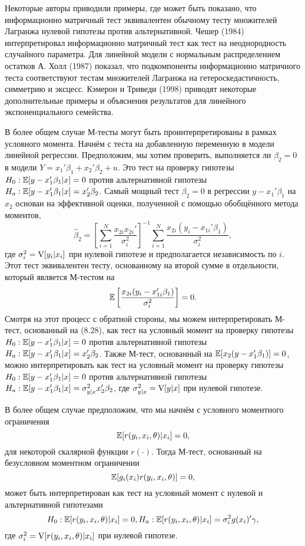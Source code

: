 Некоторые авторы приводили примеры, где может быть показано, что информационно матричный тест эквивалентен обычному тесту множителей Лагранжа нулевой гипотезы против альтернативной. Чешер (1984) интерпретировал информационно матричный тест как тест на неоднородность случайного параметра. Для линейной модели с нормальным распределением остатков А. Холл (1987) показал, что подкомпоненты информационно матричного теста соответствуют тестам множителей Лагранжа на гетероскедастичность, симметрию и эксцесс. Кэмерон и Триведи (1998) приводят некоторые дополнительные примеры и объяснения результатов для линейного экспоненциального семейства.

В более общем случае М-тесты могут быть проинтерпретированы в рамках условного момента. Начнём с теста на добавленную переменную в модели линейной регрессии. Предположим, мы хотим проверить, выполняется ли $\beta_2 = 0$ в модели $Y = x_1'\beta_1 + x_2'\beta_2 + u$. Это тест на проверку гипотезы $H_0: \mathbb{E}[y - x_1'\beta_1|x] = 0$ против альтернативной гипотезы $H_a: \mathbb{E}[y - x_1'\beta_1|x] = x_2'\beta_2$. Самый мощный тест $\beta_2 = 0$ в регрессии $y - x_1'\beta_1$ на $x_2$ основан на эффективной оценки, полученной с помощью обобщённого метода моментов,
\[
\hat{\beta}_2 = \left[ \sum_{i=1}^N \frac{x_{2i}x_{2i}'}{\sigma_i^2}\right]^{-1} \sum_{i=1}^N \frac{x_{2i}(y_i - x_{1i}'\beta_1)}{\sigma_i^2},
\]
где $\sigma_i^2 = \mathrm{V}[y_i|x_i]$ при нулевой гипотезе и предполагается независимость по $i$. Этот тест эквивалентен тесту, основанному на второй сумме в отдельности, который является М-тестом на
\begin{equation}
\mathbb{E}\left[ \frac{x_{2i}(y_i - x_{1i}'\beta_1)}{\sigma_i^2} \right] = 0.
\end{equation}
Смотря на этот процесс с обратной стороны, мы можем интерпретировать М-тест, основанный на (8.28), как тест на условный момент на проверку гипотезы $H_0: \mathbb{E}[y - x_1'\beta_1|x] = 0$ против альтернативной гипотезы $H_a: \mathbb{E}[y - x_1'\beta_1|x] = x_2'\beta_2$. Также М-тест, основанный на $\mathbb{E}[x_2(y - x_1'\beta_1)] = 0$, можно интерпретировать как тест на условный момент на проверку гипотезы $H_0: \mathbb{E}[y - x_1'\beta_1|x] = 0$ против альтернативной гипотезы $H_a: \mathbb{E}[y - x_1'\beta_1|x] = \sigma_{y|x}^2 x_2'\beta_2$, где $\sigma_{y|x}^2 = \mathrm{V}[y|x]$ при нулевой гипотезе.

В более общем случае предположим, что мы начнём с условного моментного ограничения
\begin{equation}
\mathbb{E}[r(y_i, x_i, \theta)|x_i] = 0,
\end{equation}
для некоторой скалярной функции $r(\cdot)$. Тогда М-тест, основанный на безусловном моментном ограничении
\begin{equation}
\mathbb{E}[g_i(x_i)r(y_i, x_i, \theta)] = 0,
\end{equation}
может быть интерпретирован как тест на условный момент с нулевой и альтернативной гипотезами
\begin{equation}
H_0: \mathbb{E}[r(y_i, x_i, \theta)|x_i] = 0, H_a: \mathbb{E}[r(y_i, x_i, \theta)|x_i] = \sigma_i^2 g(x_i)'\gamma,
\end{equation}
где $\sigma_i^2 = \mathrm{V}[r(y_i, x_i, \theta)|x_i]$ при нулевой гипотезе.


